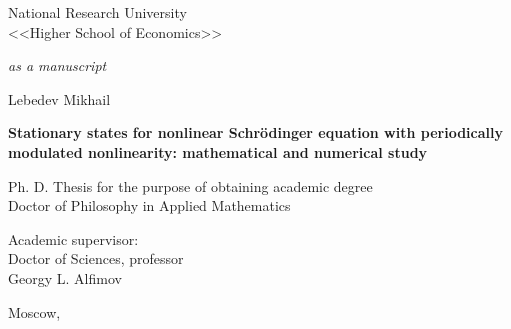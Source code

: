 \begin{titlepage}
\thispagestyle{empty}
\enlargethispage{1cm}
\vspace*{-2cm}

\begin{center}
	National Research University \\ <<Higher School of Economics>>
\end{center}

\vskip1cm
	
\begin{flushright}
	\emph{as a manuscript}
\end{flushright}
	
\vskip3cm

\begin{center}
	{\large Lebedev Mikhail}
	\vskip1cm
	{\large\bfseries Stationary states for nonlinear Schr\"odinger equation with periodically modulated nonlinearity: mathematical and numerical study\par}
	\vskip1cm
	{Ph. D. Thesis}
	\vskip1cm
	{for the purpose of obtaining academic degree \\ Doctor of Philosophy in Applied Mathematics}
\end{center}

\vskip2cm

\hspace{8cm}
\begin{minipage}{0.45\linewidth}
\begin{flushright}
	Academic supervisor: \\
	Doctor of Sciences, professor \\
	Georgy L. Alfimov
\end{flushright}
\end{minipage}

\vfill

\begin{center}
	{Moscow, \the\year}
\end{center}

\normalfont\clearpage
\end{titlepage}
